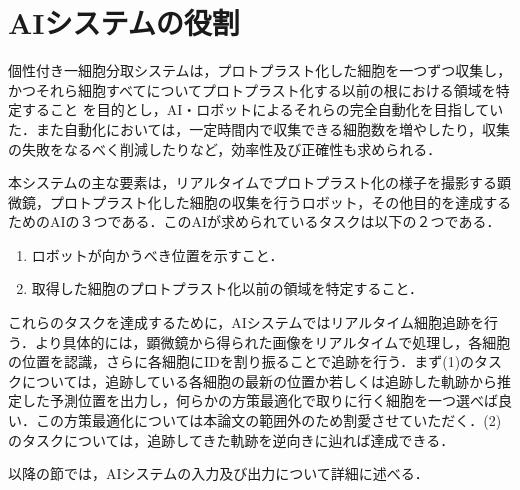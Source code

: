 \thispagestyle{fancy2}

\section{AIシステムの役割}
個性付き一細胞分取システムは，プロトプラスト化した細胞を一つずつ収集し，かつそれら細胞すべてについてプロトプラスト化する以前の根における領域を特定すること
を目的とし，AI・ロボットによるそれらの完全自動化を目指していた．また自動化においては，一定時間内で収集できる細胞数を増やしたり，収集の失敗をなるべく削減したりなど，効率性及び正確性も求められる．


\par
本システムの主な要素は，リアルタイムでプロトプラスト化の様子を撮影する顕微鏡，プロトプラスト化した細胞の収集を行うロボット，その他目的を達成するためのAIの３つである．このAIが求められているタスクは以下の２つである．

\begin{enumerate}[label=(\arabic*)]
    \item ロボットが向かうべき位置を示すこと．
    \item 取得した細胞のプロトプラスト化以前の領域を特定すること．
\end{enumerate}

これらのタスクを達成するために，AIシステムではリアルタイム細胞追跡を行う．より具体的には，顕微鏡から得られた画像をリアルタイムで処理し，各細胞の位置を認識，さらに各細胞にIDを割り振ることで追跡を行う．まず(1)のタスクについては，追跡している各細胞の最新の位置か若しくは追跡した軌跡から推定した予測位置を出力し，何らかの方策最適化で取りに行く細胞を一つ選べば良い．この方策最適化については本論文の範囲外のため割愛させていただく．(2)のタスクについては，追跡してきた軌跡を逆向きに辿れば達成できる．
\par
以降の節では，AIシステムの入力及び出力について詳細に述べる．

